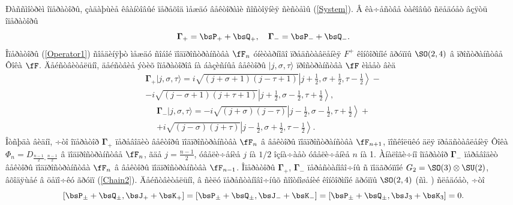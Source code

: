 Ðàññìîòðèì îïåðàòîðû, çàäàþùèå êâàíòîâûé ïåðåõîä ìåæäó âåêòîðàìè ñîñòîÿíèÿ ñèñòåìû (\ref{System}). Â êà÷åñòâå òàêîâûõ ñëåäóåò âçÿòü îïåðàòîðû
\begin{equation}\label{Operator1}
\boldsymbol{\Gamma}_+=\bsP_++\bsQ_+,\quad\boldsymbol{\Gamma}_-=\bsP_-+\bsQ_-.
\end{equation}
Îïåðàòîðû (\ref{Operator1}) ñîåäèíÿþò ìåæäó ñîáîé ïîäïðîñòðàíñòâà $\fF_n$ óíèòàðíîãî ïðåäñòàâëåíèÿ $F^+$ êîíôîðìíîé ãðóïïû $\SO(2,4)$ â ïðîñòðàíñòâå Ôîêà $\fF$. Äåéñòâèòåëüíî, äåéñòâèå ýòèõ îïåðàòîðîâ íà áàçèñíûå âåêòîðû $|j,\sigma,\tau\rangle$ ïðîñòðàíñòâà $\fF$ èìååò âèä
\begin{multline}
\boldsymbol{\Gamma}_+|j,\sigma,\tau\rangle=i\sqrt{(j+\sigma+1)(j-\tau+1)}\left|j+\frac{1}{2},\sigma+\frac{1}{2},
\tau-\frac{1}{2}\right\rangle-\\
-i\sqrt{(j-\sigma+1)(j+\tau+1)}\left|j+\frac{1}{2},\sigma-\frac{1}{2},\tau+\frac{1}{2}\right\rangle,\nonumber
\end{multline}
\begin{multline}
\boldsymbol{\Gamma}_-|j,\sigma,\tau\rangle=-i\sqrt{(j+\sigma)(j-\tau)}\left|j-\frac{1}{2},\sigma-\frac{1}{2},
\tau+\frac{1}{2}\right\rangle+\\
+i\sqrt{(j-\sigma)(j+\tau)}\left|j-\frac{1}{2},\sigma+\frac{1}{2},\tau-\frac{1}{2}\right\rangle.\nonumber
\end{multline}
Îòñþäà âèäíî, ÷òî îïåðàòîð $\boldsymbol{\Gamma}_+$ ïåðåâîäèò âåêòîðû ïîäïðîñòðàíñòâà $\fF_n$ â âåêòîðû ïîäïðîñòðàíñòâà $\fF_{n+1}$, ïîñêîëüêó äëÿ ïðåäñòàâëåíèÿ Ôîêà $\Phi_n=D_{\frac{n-1}{2},\frac{n-1}{2}}$ â ïîäïðîñòðàíñòâå $\fF_n$, ãäå $j=\frac{n-1}{2}$, óâåëè÷åíèå $j$ íà $1/2$ îçíà÷àåò óâåëè÷åíèå $n$ íà 1. Àíàëîãè÷íî îïåðàòîð $\boldsymbol{\Gamma}_-$ ïåðåâîäèò âåêòîðû ïîäïðîñòðàíñòâà $\fF_n$ â âåêòîðû ïîäïðîñòðàíñòâà $\fF_{n-1}$. Îïåðàòîðû $\boldsymbol{\Gamma}_+$, $\boldsymbol{\Gamma}_-$ ïåðåñòàíîâî÷íû ñ ïîäãðóïïîé $G_2=\SO(3)\otimes\SU(2)$, âõîäÿùåé â öåïî÷êó ãðóïï (\ref{Chain2}). Äåéñòâèòåëüíî, â ñèëó ïåðåñòàíîâî÷íûõ ñîîòíîøåíèé êîíôîðìíîé ãðóïïû $\SO(2,4)$ (ñì. \cite{Var18}) ñëåäóåò, ÷òî
\[
\left[\bsP_\pm+\bsQ_\pm,\bsJ_++\bsK_+\right]=\left[\bsP_\pm+\bsQ_\pm,\bsJ_-+\bsK_-\right]=
\left[\bsP_\pm+\bsQ_\pm,\bsJ_3+\bsK_3\right]=0.
\]
